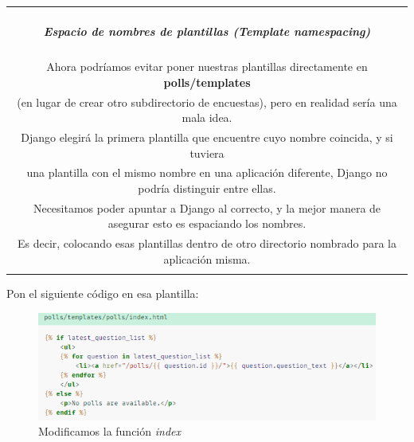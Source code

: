 \documentclass[10pt]{article}
\newcommand{\django}[1]{{\textcolor{G}{Django} #1}}
\begin{document}
\begin{table}[H]
	\begin{tabular}{||c||}
	\hline \\
	\begin{Large}
	\textbf{\textit{
Espacio de nombres de plantillas (\textit{Template namespacing})}}
	\end{Large}
	\\\\		
Ahora podríamos evitar poner nuestras plantillas directamente en \textbf{polls/templates}\\ (en lugar de crear otro subdirectorio de encuestas), pero en realidad sería una mala idea.\\ \django{} elegirá la primera plantilla que encuentre cuyo nombre coincida, y si tuviera\\ una plantilla con el mismo nombre en una aplicación diferente, \django{} no podría distinguir entre ellas.\\ Necesitamos poder apuntar a \django{} al correcto, y la mejor manera de asegurar esto es espaciando los nombres.\\ Es decir, colocando esas plantillas dentro de otro directorio nombrado para la aplicación misma.
\\\\ \hline 	
			\end{tabular}
		\end{table}		

Pon el siguiente código en esa plantilla:

\begin{figure}[H]
\begin{center}
\includegraphics[scale=1]{figuras/3/33/333/img2.png}
\caption{Modificamos la función \textit{index}}
\end{center}
\end{figure}
\end{document}
